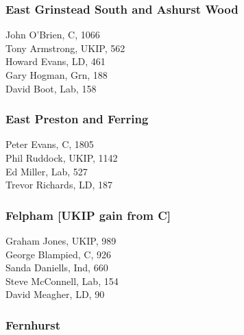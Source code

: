 \documentclass[a4paper,openany,10pt]{book}
\begin{document}
\subsubsection*{East Grinstead South and Ashurst Wood}



John O'Brien, C, 1066\\
Tony Armstrong, UKIP, 562\\
Howard Evans, LD, 461\\
Gary Hogman, Grn, 188\\
David Boot, Lab, 158\\


\subsubsection*{East Preston and Ferring}



Peter Evans, C, 1805\\
Phil Ruddock, UKIP, 1142\\
Ed Miller, Lab, 527\\
Trevor Richards, LD, 187\\


\subsubsection*{Felpham \hspace*{\fill}\nolinebreak[1]%
\enspace\hspace*{\fill}
[UKIP gain from C]}



Graham Jones, UKIP, 989\\
George Blampied, C, 926\\
Sanda Daniells, Ind, 660\\
Steve McConnell, Lab, 154\\
David Meagher, LD, 90\\


\subsubsection*{Fernhurst}

\end{document}
